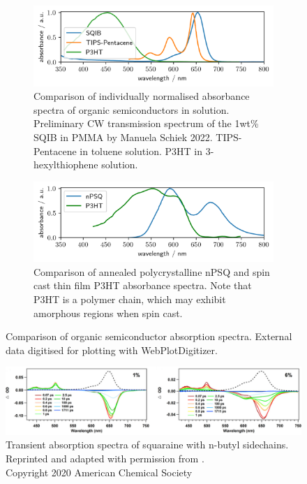 \documentclass[twoside,openright,listof=numbered]{scrreprt}
\begin{document}
\begin{figure}[hbtp]
\centering
\begin{subfigure}[b]{\textwidth}
\includegraphics[width = \textwidth]{images/spectra/OSC/ComparisonOfOSCSolution.png}
\caption{Comparison of individually normalised absorbance spectra of organic semiconductors in solution. Preliminary CW transmission spectrum of the 1wt\% SQIB in PMMA by Manuela Schiek 2022.\cite{Schiek2022} TIPS-Pentacene in toluene solution.\cite{Schaberle2020} P3HT in 3-hexylthiophene solution\cite{Rahimi2014}.}
\end{subfigure}
\begin{subfigure}[b]{\textwidth}
\includegraphics[width = \textwidth]{images/spectra/OSC/ComparisonOfOSCCrystal.png}
\caption{Comparison of annealed polycrystalline nPSQ\cite{Balzer2022} and spin cast thin film P3HT absorbance spectra. Note that P3HT is a polymer chain, which may exhibit amorphous regions when spin cast.\cite{Rahimi2014}\label{fig:crystOSC}}
\end{subfigure}
\caption[Comparison of organic semiconductor absorption spectra.]{Comparison of organic semiconductor absorption spectra. External data digitised for plotting with WebPlotDigitizer.\cite{Rohatgi2022}\label{fig:compOSC}}
\end{figure}

\begin{figure}[hbtp]
\centering
\includegraphics[scale=1.2]{images/Zheng2020SquaraineTAgraphCut.jpeg}
\caption[Transient absorption spectra of squaraine with n-butyl sidechains by Zheng.\cite{Zheng2020}]{Transient absorption spectra of squaraine with n-butyl sidechains.\\
Reprinted and adapted with permission from \protect{}. \\Copyright 2020 American Chemical Society\label{fig:zhengTA}}
\end{figure}
\end{document}
